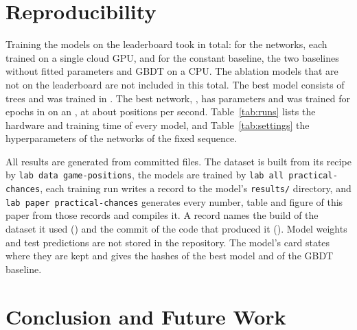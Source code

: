 \documentclass[11pt]{article}
\begin{document}
\section{Reproducibility}
\label{sec:cost}

Training the  models on the leaderboard took 
in total:  for the networks, each trained on a
single cloud GPU, and  for the constant baseline, the
two baselines without fitted parameters and GBDT on a CPU. The ablation
models that are not on the leaderboard are not included in this total. The
best model consists of  trees and was trained in
. The best network, , has
 parameters and was trained for 
epochs in  on an , at about
 positions per second. Table~\ref{tab:runs} lists
the hardware and training time of every model, and Table~\ref{tab:settings}
the hyperparameters of the networks of the fixed sequence.

All results are generated from committed files. The dataset is built from
its recipe by \texttt{lab data game-positions}, the models are trained by
\texttt{lab all practical-chances}, each training run writes a record to the
model's \texttt{results/} directory, and \texttt{lab paper practical-chances}
generates every number, table and figure of this paper from those records and
compiles it. A record names the build of the dataset it used
() and the commit of the code that produced it
(). Model weights and test predictions are not stored in the
repository. The model's card states where they are kept and gives the hashes
of the best model and of the GBDT baseline.

\section{Conclusion and Future Work}
\label{sec:conclusion}
\end{document}
